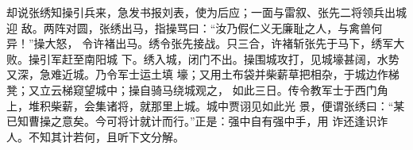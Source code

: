 却说张绣知操引兵来，急发书报刘表，使为后应；一面与雷叙、张先二将领兵出城迎
敌。两阵对圆，张绣出马，指操骂曰：“汝乃假仁义无廉耻之人，与禽兽何异！”操大怒，
令许褚出马。绣令张先接战。只三合，许褚斩张先于马下，绣军大败。操引军赶至南阳城
下。绣入城，闭门不出。操围城攻打，见城壕甚阔，水势又深，急难近城。乃令军士运土填
壕；又用土布袋并柴薪草把相杂，于城边作梯凳；又立云梯窥望城中；操自骑马绕城观之，
如此三日。传令教军士于西门角上，堆积柴薪，会集诸将，就那里上城。城中贾诩见如此光
景，便谓张绣曰：“某已知曹操之意矣。今可将计就计而行。”正是：强中自有强中手，用
诈还逢识诈人。不知其计若何，且听下文分解。